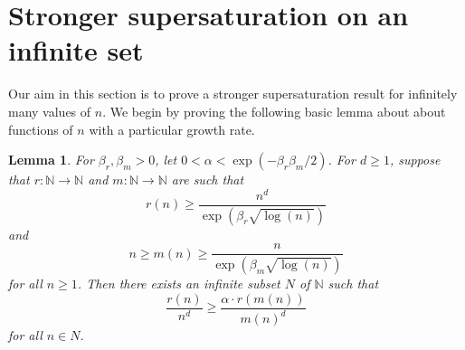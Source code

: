 \documentclass[12pt]{article}
\numberwithin{equation}{section}
\newtheorem{lem}[equation]{Lemma}
\theoremstyle{definition}
\theoremstyle{remark}
\begin{document}
\section{Stronger supersaturation on an infinite set}\label{sect:supersat}

Our aim in this section is to prove a stronger supersaturation result for infinitely many values of $n$. We begin by proving the following basic lemma about about functions of $n$ with a particular growth rate. 

\begin{lem}
\label{lem:sequence}
For $\beta_r,\beta_m>0$, let $0<\alpha<\exp(-\beta_r\beta_m/2)$. For $d\geq1$, suppose that $r:\mathbb{N}\to \mathbb{N}$ and $m:\mathbb{N}\to\mathbb{N}$ are such that
\[r(n)\geq \frac{n^d}{\exp(\beta_r\sqrt{\log(n)})}\]
and
\[n \geq m(n)\geq \frac{n}{\exp(\beta_m\sqrt{\log(n)})}\]
for all $n\geq1$. Then there exists an infinite subset $N$ of $\mathbb{N}$ such that
\[\frac{ r(n)}{n^d}\geq \frac{\alpha\cdot r(m(n))}{m(n)^d}\]
for all $n\in N$. 
\end{lem}
\end{document}
